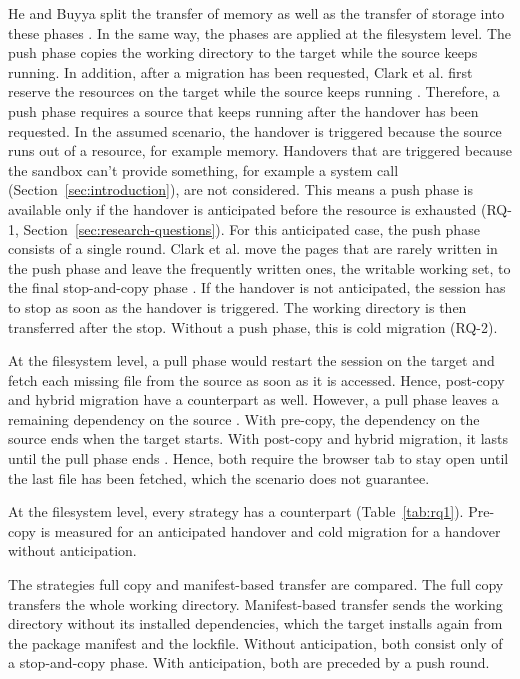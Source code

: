 He and Buyya split the transfer of memory as well as the transfer of storage into these phases \cite{he2023taxonomy}. In the same way, the phases are applied at the filesystem level.
The push phase copies the working directory to the target while the source keeps running. In addition, after a migration has been requested, Clark et al. first reserve the resources on the target while the source keeps running \cite{clark2005live}.
Therefore, a push phase requires a source that keeps running after the handover has been requested.
In the assumed scenario, the handover is triggered because the source runs out of a resource, for example memory. Handovers that are triggered because the sandbox can't provide something, for example a system call (Section~\ref{sec:introduction}), are not considered. This means a push phase is available only if the handover is anticipated before the resource is exhausted (RQ-1, Section~\ref{sec:research-questions}).
For this anticipated case, the push phase consists of a single round. Clark et al. move the pages that are rarely written in the push phase and leave the frequently written ones, the writable working set, to the final stop-and-copy phase \cite{clark2005live}.
If the handover is not anticipated, the session has to stop as soon as the handover is triggered. The working directory is then transferred after the stop. Without a push phase, this is cold migration (RQ-2).

At the filesystem level, a pull phase would restart the session on the target and fetch each missing file from the source as soon as it is accessed. Hence, post-copy and hybrid migration have a counterpart as well.
However, a pull phase leaves a remaining dependency on the source \cite{milojivcic2000process}. With pre-copy, the dependency on the source ends when the target starts. With post-copy and hybrid migration, it lasts until the pull phase ends \cite{hines2009post}. Hence, both require the browser tab to stay open until the last file has been fetched, which the scenario does not guarantee.

At the filesystem level, every strategy has a counterpart (Table~\ref{tab:rq1}). Pre-copy is measured for an anticipated handover and cold migration for a handover without anticipation.

The strategies full copy and manifest-based transfer are compared. The full copy transfers the whole working directory. Manifest-based transfer sends the working directory without its installed dependencies, which the target installs again from the package manifest and the lockfile. Without anticipation, both consist only of a stop-and-copy phase. With anticipation, both are preceded by a push round.

